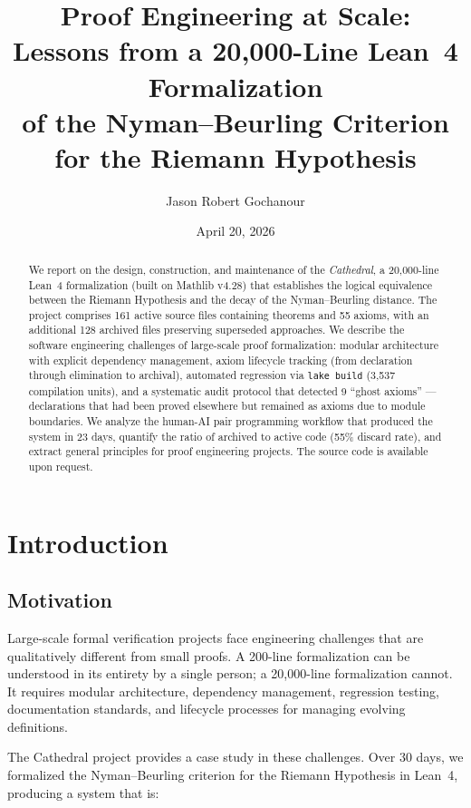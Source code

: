 \documentclass[11pt,a4paper]{article}
\title{%
  Proof Engineering at Scale:\\
  Lessons from a 20,000-Line Lean~4 Formalization\\
  of the Nyman--Beurling Criterion for the Riemann Hypothesis%
}
\author{
  Jason Robert Gochanour
}
\date{April 20, 2026}
\begin{document}
\maketitle

\begin{abstract}
We report on the design, construction, and maintenance of the
\emph{Cathedral}, a 20,000-line Lean~4 formalization (built on
Mathlib v4.28) that establishes the logical equivalence between
the Riemann Hypothesis and the decay of the Nyman--Beurling
distance. The project comprises 161 active source files containing
theorems and 55 axioms, with an additional 128 archived files
preserving superseded approaches. We describe the software
engineering challenges of large-scale proof formalization:
modular architecture with explicit dependency management, axiom
lifecycle tracking (from declaration through elimination to
archival), automated regression via \texttt{lake build} (3,537
compilation units), and a systematic audit protocol that detected
9 ``ghost axioms'' --- declarations that had been proved elsewhere
but remained as axioms due to module boundaries. We analyze the
human-AI pair programming workflow that produced the system in 23
days, quantify the ratio of archived to active code (55\%
discard rate), and extract general principles for proof engineering
projects. The source code is available upon request.
\end{abstract}

\tableofcontents

\section{Introduction}

\subsection{Motivation}

Large-scale formal verification projects face engineering challenges
that are qualitatively different from small proofs. A 200-line
formalization can be understood in its entirety by a single person;
a 20,000-line formalization cannot. It requires modular architecture,
dependency management, regression testing, documentation standards,
and lifecycle processes for managing evolving definitions.

The Cathedral project provides a case study in these challenges. Over
30 days, we formalized the Nyman--Beurling criterion for the Riemann
Hypothesis in Lean~4, producing a system that is:
\end{document}
